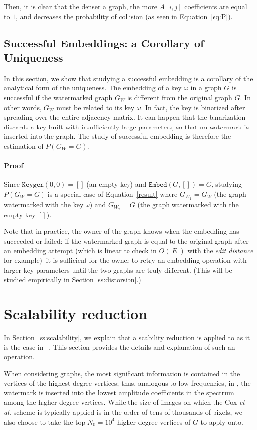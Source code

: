 Then, it is clear that the denser a graph, the more $A[i,j]$ coefficients are equal to $1$, and decreases the probability of collision (as seen in Equation~\eqref{eq:P}).

\subsection{Successful Embeddings: a Corollary of Uniqueness}
In this section, we show that studying a successful embedding is a corollary of the analytical form of the uniqueness. The embedding of a key $\omega$ in a graph $G$ is successful if the watermarked graph $G_W$ is different from the original graph $G$. In other words, $G_W$ must be related to its key $\omega$.
In fact, the key is binarized after spreading over the entire adjacency matrix. It can happen that the binarization discards a key built with insufficiently large parameters, so that no watermark is inserted into the graph. The study of successful embedding is therefore the estimation of $P(G_{W} = G)$.

\paragraph*{Proof}
Since $\texttt{Keygen}(0,0) =  []$ (an empty key) and  $\texttt{Embed}(G, []) = G$, studying $P(G_{W} = G)$ is a special case of Equation~\eqref{result} where $G_{W_1} = G_{W}$ (the graph watermarked with the key $\omega$) and $G_{W_2} = G$ (the graph watermarked with the empty key $[]$).

Note that in practice, the owner of the graph knows when the embedding has succeeded or failed: if the watermarked graph is equal to the original graph after an embedding attempt (which is linear to check in $O(|E|)$ with the \textit{edit distance} for example), it is sufficient for the owner to retry an embedding operation with larger key parameters until the two graphs are truly different. (This will be studied empirically in Section \ref{ss:distorsion}.)

\section{Scalability reduction}\label{a:reduction}
In Section~\ref{ss:scalability}, we explain that a scability reduction is applied to \scheme as it is the case in ~\cite{isc, COSN}. This section provides the details and explanation of such an operation. 

When considering graphs, the most significant information is contained in the vertices of the highest degree vertices; thus, analogous to low frequencies, in \scheme, the watermark is inserted into the lowest amplitude coefficients in the spectrum among the higher-degree vertices.
While the size of images on which the Cox \textit{et al.} scheme is typically applied is in the order of tens of thousands of pixels,
we also choose to take the top $N_0 = 10^4$ higher-degree vertices of $G$ to apply \scheme onto.


